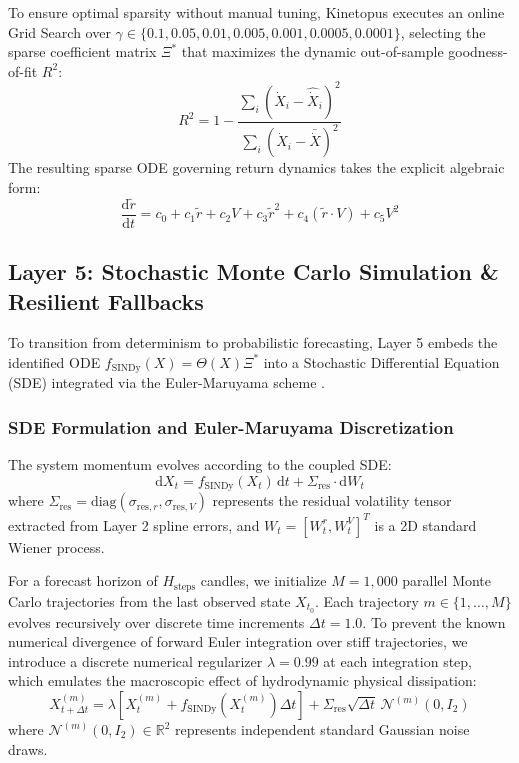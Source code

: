 \documentclass[11pt,a4paper]{article}
\begin{document}
To ensure optimal sparsity without manual tuning, Kinetopus executes an online Grid Search over $\gamma \in \{0.1, 0.05, 0.01, 0.005, 0.001, 0.0005, 0.0001\}$, selecting the sparse coefficient matrix $\Xi^*$ that maximizes the dynamic out-of-sample goodness-of-fit $R^2$:
\begin{equation}
    R^2 = 1 - \frac{\sum_{i} (\dot{X}_i - \widehat{\dot{X}}_i)^2}{\sum_{i} (\dot{X}_i - \bar{\dot{X}})^2}
\end{equation}
The resulting sparse ODE governing return dynamics takes the explicit algebraic form:
\begin{equation}
    \frac{\mathrm{d}\tilde{r}}{\mathrm{d}t} = c_0 + c_1 \tilde{r} + c_2 V + c_3 \tilde{r}^2 + c_4 (\tilde{r} \cdot V) + c_5 V^2
\end{equation}

\subsection{Layer 5: Stochastic Monte Carlo Simulation \& Resilient Fallbacks}
\label{sec:layer5}

To transition from determinism to probabilistic forecasting, Layer 5 embeds the identified ODE $f_{\text{SINDy}}(X) = \Theta(X)\Xi^*$ into a Stochastic Differential Equation (SDE) integrated via the Euler-Maruyama scheme \cite{maruyama1955continuous, kloeden1992numerical}.

\subsubsection{SDE Formulation and Euler-Maruyama Discretization}
The system momentum evolves according to the coupled SDE:
\begin{equation}
    \mathrm{d}X_t = f_{\text{SINDy}}(X_t) \, \mathrm{d}t + \Sigma_{\text{res}} \cdot \mathrm{d}W_t
\end{equation}
where $\Sigma_{\text{res}} = \text{diag}(\sigma_{\text{res}, r}, \sigma_{\text{res}, V})$ represents the residual volatility tensor extracted from Layer 2 spline errors, and $W_t = [W_t^r, W_t^V]^T$ is a 2D standard Wiener process.

For a forecast horizon of $H_{\text{steps}}$ candles, we initialize $M = 1,000$ parallel Monte Carlo trajectories from the last observed state $X_{t_0}$. Each trajectory $m \in \{1, \dots, M\}$ evolves recursively over discrete time increments $\Delta t = 1.0$. To prevent the known numerical divergence of forward Euler integration over stiff trajectories, we introduce a discrete numerical regularizer $\lambda = 0.99$ at each integration step, which emulates the macroscopic effect of hydrodynamic physical dissipation:
\begin{equation}
    X_{t+\Delta t}^{(m)} = \lambda \left[ X_t^{(m)} + f_{\text{SINDy}}\left(X_t^{(m)}\right) \Delta t \right] + \Sigma_{\text{res}} \sqrt{\Delta t} \, \mathcal{N}^{(m)}(0, I_2)
\end{equation}
where $\mathcal{N}^{(m)}(0, I_2) \in \mathbb{R}^2$ represents independent standard Gaussian noise draws.
\end{document}
